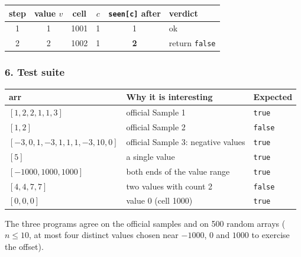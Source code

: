 \begin{tracebox}[{Sample 2: $[1,2]$}]
\centering
{}

\medskip
\small
\begin{tabular}{@{}cccccl@{}}
\toprule
\textbf{step} & \textbf{value $v$} & \textbf{cell} & $c$ & \texttt{seen[c]} after & \textbf{verdict} \\
\midrule
1 & 1 & 1001 & 1 & 1 & ok \\
2 & 2 & 1002 & 1 & \textbf{2} & return \texttt{false} \\
\bottomrule
\end{tabular}
\end{tracebox}

\subsubsection*{6. Test suite}

\begin{testbox}
\centering\small
\begin{tabular}{@{}lll@{}}
\toprule
\textbf{arr} & \textbf{Why it is interesting} & \textbf{Expected} \\
\midrule
$[1,2,2,1,1,3]$ & official Sample 1 & \texttt{true} \\
$[1,2]$ & official Sample 2 & \texttt{false} \\
$[-3,0,1,-3,1,1,1,-3,10,0]$ & official Sample 3: negative values & \texttt{true} \\
$[5]$ & a single value & \texttt{true} \\
$[-1000, 1000, 1000]$ & both ends of the value range & \texttt{true} \\
$[4,4,7,7]$ & two values with count 2 & \texttt{false} \\
$[0,0,0]$ & value 0 (cell 1000) & \texttt{true} \\
\bottomrule
\end{tabular}

\medskip
The three programs agree on the official samples and on 500 random arrays ($n \le 10$, at most four distinct values chosen near $-1000$, $0$ and $1000$ to exercise the offset).
\end{testbox}

